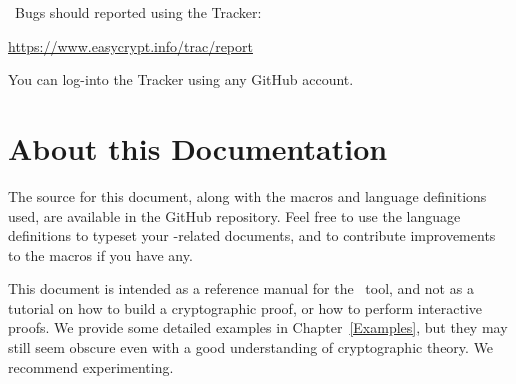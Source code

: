 \EasyCrypt\ Bugs should reported using the Tracker:
\begin{center}
  \url{https://www.easycrypt.info/trac/report}
\end{center}
You can log-into the Tracker using any GitHub account.

\section{About this Documentation}

The source for this document, along with the macros and language
definitions used, are available in the GitHub repository. Feel free to
use the language definitions to typeset your \EasyCrypt-related
documents, and to contribute improvements to the macros if you have
any.

This document is intended as a reference manual for the \EasyCrypt\
tool, and not as a tutorial on how to build a cryptographic proof, or
how to perform interactive proofs. We provide some detailed examples
in Chapter~\ref{Examples}, but they may still seem obscure
even with a good understanding of cryptographic theory. We recommend
experimenting.
